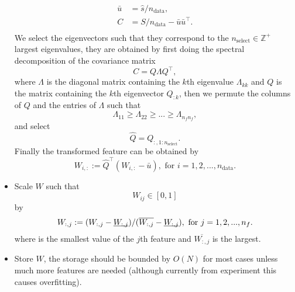 \documentclass[12pt]{article}
\begin{document}
\begin{itemize}
		\begin{equation}
			\begin{split}
				\bar{u} &= \hat{s}/n_\text{data}, \\
				C &= S/n_\text{data} - \bar{u}\bar{u}^\top. \\			
			\end{split}
		\end{equation}
		We select the eigenvectors such that they correspond to the $n_\text{select} \in \mathbb{Z}^+$ largest eigenvalues, they are obtained by first doing the spectral decomposition of the covariance matrix
		\begin{equation}
			C = Q\Lambda Q^\top,
		\end{equation}
		where $\Lambda$ is the diagonal matrix containing the $k$th eigenvalue $\Lambda_{kk}$ and $Q$ is the matrix containing the $k$th eigenvector $Q_{:k}$, then we permute the columns of $Q$ and the entries of $\Lambda$ such that
		\begin{equation}
			\Lambda_{11} \geq \Lambda_{22} \geq  ... \geq \Lambda_{n_fn_f},
		\end{equation}
		and select
		\begin{equation}
			\hat{Q} = Q_{:, 1:n_\text{select}}.
		\end{equation}
		Finally the transformed feature can be obtained by
		\begin{equation}
			W_{i,:} := \hat{Q}^\top(W_{i,:} - \bar{u}), \text{ for }i = 1,2,...,n_\text{data}.
		\end{equation}
	\item Scale $W$ such that 
	\begin{equation}
		W_{ij} \in [0, 1]
	\end{equation}
	by
	\begin{equation}
		\begin{split}
			W_{:,j} := (W_{:,j} - \underbar{$W_{:,j}$})/ (\overline{W_{:,j}} - \underbar{$W_{:,j}$}), \text{ for } j = 1,2,..., n_f.
		\end{split}
	\end{equation}
	where  is the smallest value of the $j$th feature and $\overline{W_{:,j}}$ is the largest.
	\item Store $W$, the storage should be bounded by $O(N)$ for most cases unless much more features are needed (although currently from experiment this causes overfitting).
\end{itemize}
\end{document}
